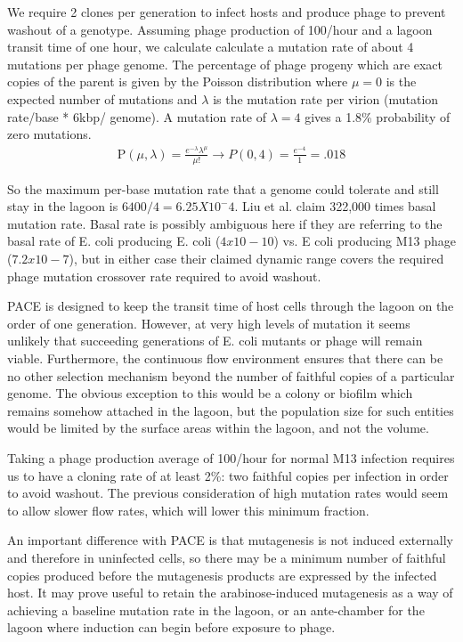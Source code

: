 \documentclass[10pt,letterpaper]{article}
\begin{document}
We require 2 clones per generation to infect hosts and produce phage to prevent washout of a genotype. Assuming phage production of 100/hour and a lagoon transit time of one hour, we calculate calculate a mutation rate of about 4 mutations per phage genome.  The percentage of phage progeny which are exact copies of the parent is given by the Poisson distribution where $\mu = 0$ is the expected number of mutations and $\lambda$ is the mutation rate per virion (mutation rate/base * 6kbp/ genome).
A mutation rate of $\lambda = 4$ gives a 1.8\% probability of zero mutations.
\vskip 0.2cm
\begin{eqnarray}
\label{eq:POC}
\mathrm{P}\left( \mu, \lambda \right) = \frac{{e^{ - \lambda } \lambda ^ \mu }}{{\mu!}}
 \rightarrow P(0,4) = \frac{{e^{ - 4 }}}{{1}} = .018
\end{eqnarray}

So the maximum per-base mutation rate that a genome could tolerate and still stay in the lagoon is $6400/4 = 6.25 X 10^-4$.
Liu et al. claim 322,000 times basal mutation rate. Basal rate is possibly ambiguous here if they are referring to the basal rate of E. coli producing E. coli  ($4x10-10$) vs. E coli producing M13 phage ($7.2 x 10-7$), but in either case their claimed dynamic range covers the required phage mutation crossover rate required to avoid washout.

PACE is designed to keep the transit time of host cells through the lagoon on the order of one generation.  However, at very high levels of mutation it seems unlikely that succeeding generations of E. coli mutants or phage will remain viable. Furthermore, the continuous flow environment ensures that there can be no other selection mechanism beyond the number of faithful copies of a particular genome.  The obvious exception to this would be a colony or biofilm which remains somehow attached in the lagoon, but the population size for such entities would be limited by the surface areas within the lagoon, and not the volume.

Taking a phage production average of 100/hour for normal M13 infection requires us to have a cloning rate of at least 2\%: two faithful copies per infection in order to avoid washout.  The previous consideration of high mutation rates would seem to allow slower flow rates, which will lower this minimum fraction.

An important difference with PACE is that mutagenesis is not induced externally and therefore in uninfected cells, so there may be a minimum number of faithful copies produced before the mutagenesis products are expressed by the infected host.  It may prove useful to retain the arabinose-induced mutagenesis as a way of achieving a baseline mutation rate in the lagoon, or an ante-chamber for the lagoon where induction can begin before exposure to phage.
\end{document}
